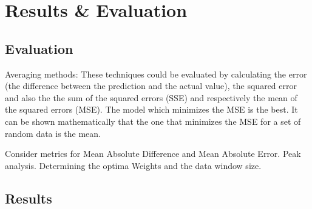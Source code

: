 \chapter{Results \& Evaluation}

\section{Evaluation}
Averaging methods: These techniques could be evaluated by calculating the error (the difference between the prediction and the actual value), the squared error and also the the sum of the squared errors (SSE) and respectively the mean of the squared errors (MSE).
The model which minimizes the MSE is the best. It can be shown mathematically that the one that minimizes the MSE for a set of random data is the mean.

Consider metrics for Mean Absolute Difference and Mean Absolute Error. Peak analysis.
Determining the optima Weights and the data window size.

\section{Results}
